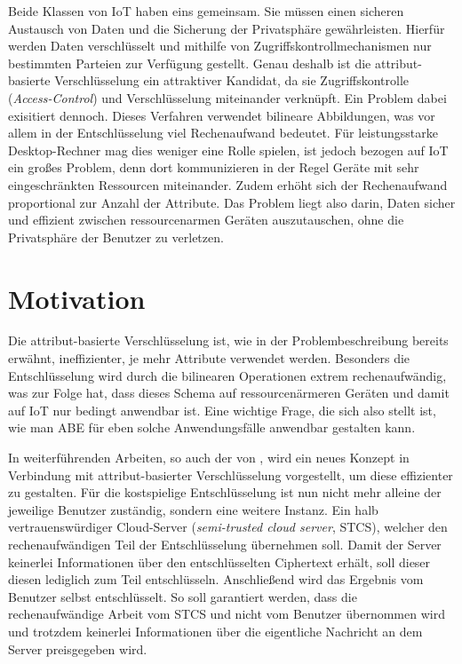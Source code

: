 \documentclass{hsflensburg}
\begin{document}
	Beide Klassen von IoT haben eins gemeinsam. Sie müssen einen sicheren Austausch
	von Daten und die Sicherung der Privatsphäre gewährleisten. Hierfür werden
	Daten verschlüsselt und mithilfe von Zugriffskontrollmechanismen nur
	bestimmten Parteien zur Verfügung gestellt. Genau deshalb ist die
	attribut-basierte Verschlüsselung ein attraktiver Kandidat, da sie
	Zugriffskontrolle (\textit{Access-Control}) und Verschlüsselung miteinander
	verknüpft. Ein Problem dabei exisitiert dennoch. Dieses Verfahren verwendet
	bilineare Abbildungen, was vor allem in der Entschlüsselung viel Rechenaufwand
	bedeutet. Für leistungsstarke Desktop-Rechner mag dies weniger eine Rolle
	spielen, ist jedoch bezogen auf IoT ein großes Problem, denn dort
	kommunizieren in der Regel Geräte mit sehr eingeschränkten Ressourcen
	miteinander. Zudem erhöht sich der Rechenaufwand proportional zur Anzahl
	der Attribute. Das Problem liegt also darin, Daten sicher und effizient
	zwischen ressourcenarmen Geräten auszutauschen, ohne die Privatsphäre der
	Benutzer zu verletzen.

	\section{Motivation}
	Die attribut-basierte Verschlüsselung ist, wie in der Problembeschreibung
	bereits erwähnt, ineffizienter, je mehr Attribute verwendet werden. Besonders
	die Entschlüsselung wird durch die bilinearen Operationen extrem
	rechenaufwändig, was zur Folge hat, dass dieses Schema auf ressourcenärmeren
	Geräten und damit auf IoT nur bedingt anwendbar ist. Eine wichtige Frage, die
	sich also stellt ist, wie man ABE für eben solche Anwendungsfälle anwendbar
	gestalten kann.

	In weiterführenden Arbeiten, so auch der von \cite{green}, wird ein neues
	Konzept in Verbindung mit attribut-basierter Verschlüsselung vorgestellt, um
	diese effizienter zu gestalten. Für die kostspielige Entschlüsselung ist nun
	nicht mehr alleine der jeweilige Benutzer zuständig, sondern eine weitere
	Instanz. Ein halb vertrauenswürdiger Cloud-Server (\textit{semi-trusted cloud
	server}, STCS), welcher den rechenaufwändigen Teil der Entschlüsselung
	übernehmen soll. Damit der Server keinerlei Informationen über den
	entschlüsselten Ciphertext erhält, soll dieser diesen lediglich zum Teil
	entschlüsseln.  Anschließend wird das Ergebnis vom Benutzer selbst
	entschlüsselt. So soll garantiert werden, dass die rechenaufwändige Arbeit vom
	STCS und nicht vom Benutzer übernommen wird und trotzdem keinerlei
	Informationen über die eigentliche Nachricht an dem Server preisgegeben wird.
\end{document}
